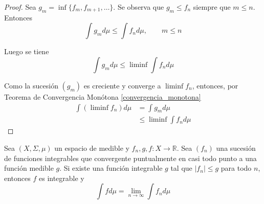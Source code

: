 \begin{proof}
	Sea $g_m = \inf \{ f_m,f_{m+1},\ldots \}$. Se observa que $g_m \leq f_n$ siempre que $m \leq n$. Entonces
	\begin{equation}
		\int g_m d\mu \leq \int f_n d\mu, \qquad m \leq n
	\end{equation}
	
	Luego se tiene
	\begin{equation}
		\int g_m d\mu \leq \liminf 	\int f_n d\mu
	\end{equation}
	
	Como la sucesión $(g_m)$ es creciente y converge a $\liminf f_n$, entonces, por Teorema de Convergencia Monótona \ref{convergencia_monotona}
	\begin{align}
		\int (\liminf f_n) d\mu &= \int g_m d\mu\\
		&\leq \liminf \int f_n d\mu
	\end{align}
\end{proof}

\begin{teorema}\label{convergencia_dominada}
	Sea $(X,\Sigma,\mu)$ un espacio de medible y $f_n,g,f: X \rightarrow \mathbb{R}$. Sea $(f_n)$ una sucesión de funciones integrables que convergente puntualmente en casi todo punto  a una función medible $g$. Si existe una función integrable $g$ tal que $|f_n| \leq g$ para todo $n$, entonces $f$ es integrable y
	\begin{equation}
		\int f d\mu = \lim_{n \rightarrow \infty} \int f_n d\mu
	\end{equation}
\end{teorema}

